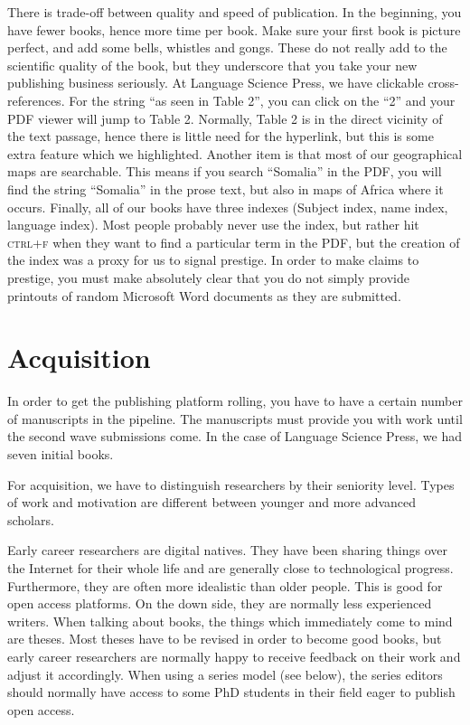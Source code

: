 \documentclass[nonflat,smallfont
]{langsci/langscibook}
\begin{document}
There is trade-off between quality and speed of publication. In the beginning, you have fewer books, hence more time per book. Make sure your first book is picture perfect, and add some bells, whistles and gongs. These do not really add to the scientific quality of the book, but they underscore that you take your new publishing business seriously. At Language Science Press, we have clickable cross-references. For the string ``as seen in Table 2'', you can click on the ``2'' and your PDF viewer will jump to Table 2. Normally, Table 2 is in the direct vicinity of the text passage, hence there is little need for the hyperlink, but this is some extra feature which we highlighted. Another item is that most of our geographical maps are searchable. This means if you search ``Somalia'' in the PDF, you will find the string ``Somalia'' in the prose text, but also in maps of Africa where it occurs. Finally, all of our books have three indexes (Subject index, name index, language index). Most people probably never use the index,  but rather hit \textsc{ctrl+f} when they want to find a particular term in the PDF, but the creation of the index was a proxy for us to signal prestige. In order to make claims to prestige, you must make absolutely clear that you do not simply provide printouts of random Microsoft Word documents as they are submitted. 


\section{Acquisition}\label{sec:acquisition}
In order to get the publishing platform rolling, you have to have a certain number of manuscripts in the pipeline. The manuscripts must provide you with work until the second wave submissions come. In the case of Language Science Press, we had seven  initial books. 

For acquisition, we have to distinguish researchers by their seniority level. Types of work and motivation are different between younger and more advanced scholars.

Early career researchers are digital natives. They have been sharing things over the Internet for their whole life and are generally close to technological progress. Furthermore, they are often more idealistic than older people. This is good for open access platforms. On the down side, they are normally less experienced writers. When talking about books, the things which immediately come to mind are theses. Most theses have to be revised in order to become good books, but early career researchers are normally happy to receive feedback on their work and adjust it accordingly. When using a series model (see below), the series editors should normally have access to some PhD students in their field eager to publish open access. 
\end{document}

